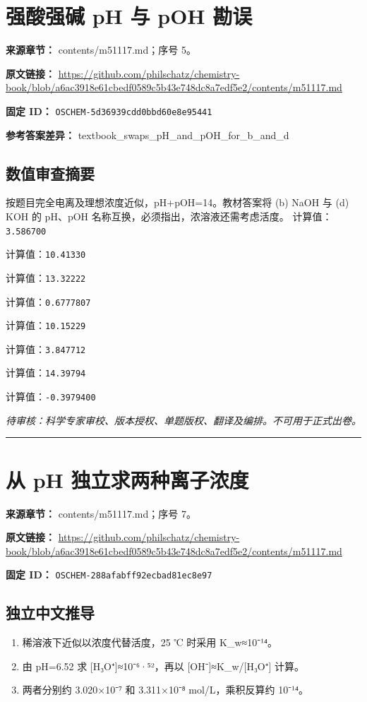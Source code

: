 \documentclass[UTF8,11pt,oneside,openany,fontset=none]{ctexbook}
\begin{document}
\section{强酸强碱 pH 与 pOH 勘误}
\noindent\textbf{来源章节：} contents/m51117.md；序号 5。\par
\noindent\textbf{原文链接：} \url{https://github.com/philschatz/chemistry-book/blob/a6ac3918e61cbedf0589c5b43e748dc8a7edf5e2/contents/m51117.md}\par
\noindent\textbf{固定 ID：} \texttt{OSCHEM-5d36939cdd0bbd60e8e95441}\par
\textbf{参考答案差异：} textbook\_swaps\_pH\_and\_pOH\_for\_b\_and\_d\par
\subsection*{数值审查摘要}
按题目完全电离及理想浓度近似，pH+pOH=14。教材答案将 (b) NaOH 与 (d) KOH 的 pH、pOH 名称互换，必须指出，浓溶液还需考虑活度。
\noindent 计算值：\texttt{3.586700}\par
\noindent 计算值：\texttt{10.41330}\par
\noindent 计算值：\texttt{13.32222}\par
\noindent 计算值：\texttt{0.6777807}\par
\noindent 计算值：\texttt{10.15229}\par
\noindent 计算值：\texttt{3.847712}\par
\noindent 计算值：\texttt{14.39794}\par
\noindent 计算值：\texttt{-0.3979400}\par
\noindent\textit{待审核：科学专家审校、版本授权、单题版权、翻译及编排。不可用于正式出卷。}
\medskip\hrule\medskip
\section{从 pH 独立求两种离子浓度}
\noindent\textbf{来源章节：} contents/m51117.md；序号 7。\par
\noindent\textbf{原文链接：} \url{https://github.com/philschatz/chemistry-book/blob/a6ac3918e61cbedf0589c5b43e748dc8a7edf5e2/contents/m51117.md}\par
\noindent\textbf{固定 ID：} \texttt{OSCHEM-288afabff92ecbad81ec8e97}\par
\subsection*{独立中文推导}
\begin{enumerate}
\item 稀溶液下近似以浓度代替活度，25 ℃ 时采用 K\_w≈10⁻¹⁴。
\item 由 pH=6.52 求 [H₃O⁺]≈10⁻⁶·⁵²，再以 [OH⁻]≈K\_w/[H₃O⁺] 计算。
\item 两者分别约 3.020×10⁻⁷ 和 3.311×10⁻⁸ mol/L，乘积反算约 10⁻¹⁴。
\end{enumerate}
\end{document}
